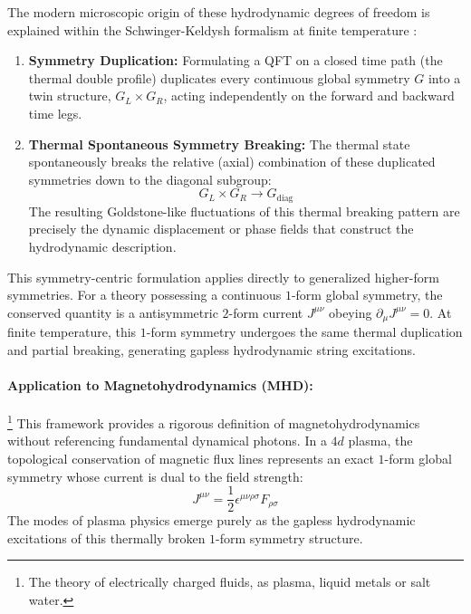 \documentclass[aps,preprint,nofootinbib,preprintnumbers,eqsecnum,superscriptaddress]{revtex4}
\numberwithin{equation}{section}
\begin{document}
The modern microscopic origin of these hydrodynamic degrees of freedom is explained within the Schwinger-Keldysh formalism at finite temperature \cite{Delacretaz_2025}:
\begin{enumerate}[\itshape i)]
    \item \textbf{Symmetry Duplication:} Formulating a QFT on a closed time path (the thermal double profile) duplicates every continuous global symmetry $G$ into a twin structure, $G_L \times G_R$, acting independently on the forward and backward time legs.
    \item \textbf{Thermal Spontaneous Symmetry Breaking:} The thermal state spontaneously breaks the relative (axial) combination of these duplicated symmetries down to the diagonal subgroup:
    \begin{equation}
        G_L \times G_R \longrightarrow G_{\text{diag}}
    \end{equation}
    The resulting Goldstone-like fluctuations of this thermal breaking pattern are precisely the dynamic displacement or phase fields that construct the hydrodynamic description. 
\end{enumerate}

This symmetry-centric formulation applies directly to generalized higher-form symmetries. For a theory possessing a continuous $1$-form global symmetry, the conserved quantity is a antisymmetric $2$-form current $J^{\mu\nu}$ obeying $\partial_{\mu} J^{\mu\nu} = 0$. At finite temperature, this $1$-form symmetry undergoes the same thermal duplication and partial breaking, generating gapless hydrodynamic string excitations.

\paragraph{Application to Magnetohydrodynamics (MHD):}\footnote{The theory of electrically charged fluids, as plasma, liquid metals or salt water.}
This framework provides a rigorous definition of magnetohydrodynamics without referencing fundamental dynamical photons. In a $4d$ plasma, the topological conservation of magnetic flux lines represents an exact $1$-form global symmetry whose current is dual to the field strength:
\begin{equation}
    J^{\mu\nu} = \frac{1}{2} \epsilon^{\mu\nu\rho\sigma} F_{\rho\sigma}
\end{equation}
The modes of plasma physics emerge purely as the gapless hydrodynamic excitations of this thermally broken $1$-form symmetry structure.
\end{document}
